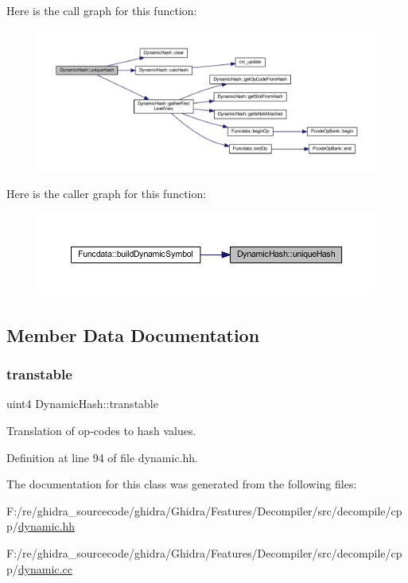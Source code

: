 Here is the call graph for this function\+:
\nopagebreak
\begin{figure}[H]
\begin{center}
\leavevmode
\includegraphics[width=350pt]{class_dynamic_hash_a9255e5fffe4408f9e3f84a3f0847527e_cgraph}
\end{center}
\end{figure}
Here is the caller graph for this function\+:
\nopagebreak
\begin{figure}[H]
\begin{center}
\leavevmode
\includegraphics[width=350pt]{class_dynamic_hash_a9255e5fffe4408f9e3f84a3f0847527e_icgraph}
\end{center}
\end{figure}


\subsection{Member Data Documentation}
\mbox{\label{class_dynamic_hash_a63ef9a666444db8c81bce80dd96bb965}} 
\subsubsection{\texorpdfstring{transtable}{transtable}}
{\footnotesize\ttfamily uint4 Dynamic\+Hash\+::transtable\hspace{0.3cm}{\ttfamily [static]}}



Translation of op-\/codes to hash values. 



Definition at line 94 of file dynamic.\+hh.



The documentation for this class was generated from the following files\+:\begin{DoxyCompactItemize}
\item 
F\+:/re/ghidra\+\_\+sourcecode/ghidra/\+Ghidra/\+Features/\+Decompiler/src/decompile/cpp/\mbox{\hyperlink{dynamic_8hh}{dynamic.\+hh}}\item 
F\+:/re/ghidra\+\_\+sourcecode/ghidra/\+Ghidra/\+Features/\+Decompiler/src/decompile/cpp/\mbox{\hyperlink{dynamic_8cc}{dynamic.\+cc}}\end{DoxyCompactItemize}
